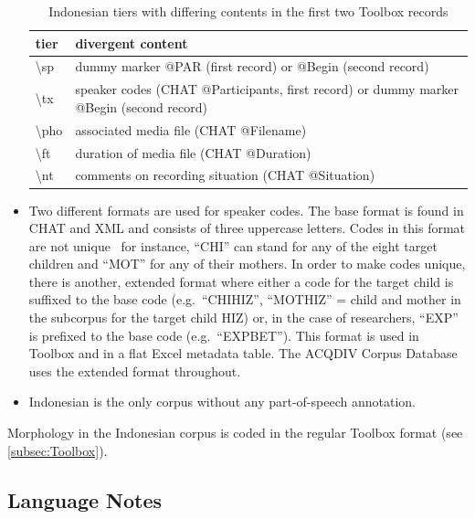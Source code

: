 \documentclass[a4paper, 11pt]{book}
\newcommand{\bks}{\textbackslash}	%
\begin{document}
\begin{itemize}
		\begin{table}[h!]
			\centering
			\begin{tabular}{lp{}}
				\toprule
					\textbf{tier}	& \textbf{divergent content} \\
				\midrule
					\bks sp 	&  dummy marker @PAR (first record) or @Begin (second record) \\
					\bks tx 	&  speaker codes (CHAT @Participants, first record) or dummy marker @Begin (second record)\\
					\bks pho 	&  associated media file (CHAT @Filename) \\
					\bks ft 	&  duration of media file (CHAT @Duration) \\
					\bks nt 	&  comments on recording situation (CHAT @Situation) \\
				\bottomrule
			\end{tabular}
			\caption{Indonesian tiers with differing contents in the first two Toolbox records}
			\label{tab:Indonesian tiers with different contents in the first two Toolbox records}
		\end{table}
		
	\item Two different formats are used for speaker codes. The base format is found in CHAT and XML and consists of three uppercase letters. 
		Codes in this format are not unique \textendash\ for instance, “CHI” can stand for any of the eight target children and “MOT” for any
		of their mothers. In order to make codes unique, there is another, extended format where either a code for the target child is suffixed
		to the base code (e.g.\ “CHIHIZ”, “MOTHIZ” = child and mother in the subcorpus for the target child HIZ) or, in the case of researchers, 
		“EXP” is prefixed to the base code (e.g.\ “EXPBET”). This format is used in Toolbox and in a flat Excel metadata table. 
		The ACQDIV Corpus Database uses the extended format throughout. 
	\item Indonesian is the only corpus without any part-of-speech annotation. 
\end{itemize}

\noindent Morphology in the Indonesian corpus is coded in the regular Toolbox format (see \autoref{subsec:Toolbox}). 

\subsection{Language Notes}
\end{document}
